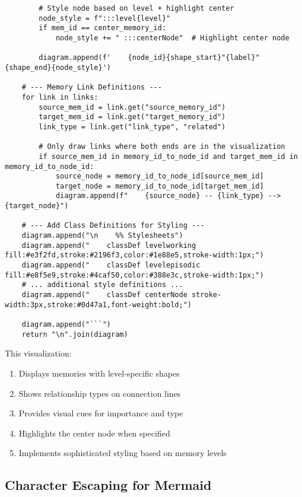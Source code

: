 \documentclass[12pt,a4paper]{article}
\begin{document}
\begin{pageablecode}
\begin{verbatim}
        # Style node based on level + highlight center
        node_style = f":::level{level}"
        if mem_id == center_memory_id:
            node_style += " :::centerNode"  # Highlight center node

        diagram.append(f'    {node_id}{shape_start}"{label}"{shape_end}{node_style}')

    # --- Memory Link Definitions ---
    for link in links:
        source_mem_id = link.get("source_memory_id")
        target_mem_id = link.get("target_memory_id")
        link_type = link.get("link_type", "related")

        # Only draw links where both ends are in the visualization
        if source_mem_id in memory_id_to_node_id and target_mem_id in memory_id_to_node_id:
            source_node = memory_id_to_node_id[source_mem_id]
            target_node = memory_id_to_node_id[target_mem_id]
            diagram.append(f"    {source_node} -- {link_type} --> {target_node}")

    # --- Add Class Definitions for Styling ---
    diagram.append("\n    %% Stylesheets")
    diagram.append("    classDef levelworking fill:#e3f2fd,stroke:#2196f3,color:#1e88e5,stroke-width:1px;")
    diagram.append("    classDef levelepisodic fill:#e8f5e9,stroke:#4caf50,color:#388e3c,stroke-width:1px;")
    # ... additional style definitions ...
    diagram.append("    classDef centerNode stroke-width:3px,stroke:#0d47a1,font-weight:bold;")

    diagram.append("```")
    return "\n".join(diagram)
\end{verbatim}
\end{pageablecode}
This visualization:
\begin{enumerate}[label=\arabic*.]
    \item Displays memories with level-specific shapes
    \item Shows relationship types on connection lines
    \item Provides visual cues for importance and type
    \item Highlights the center node when specified
    \item Implements sophisticated styling based on memory levels
\end{enumerate}

\subsection*{Character Escaping for Mermaid}
\end{document}
